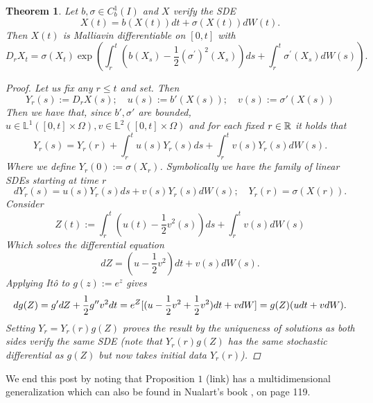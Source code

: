 \documentclass[12pt]{article}
\newtheorem{theorem}{Theorem}
\begin{document}
\begin{theorem}
	Let $b,\sigma \in C^1_b(I)$ and $X$ verify  the SDE
	\begin{equation*}
		X(t)=b(X(t))d t +\sigma(X(t)) dW(t).
	\end{equation*}
	Then $X(t)$ is Malliavin differentiable on $[0,t]$ with
	\begin{equation*}
		D_r X_t=\sigma\left(X_t\right) \exp \left(\int_r^t\left(b\left(X_s\right)-\frac{1}{2}\left(\sigma^{\prime}\right)^2\left(X_s\right)\right) d s+\int_r^t \sigma^{\prime}\left(X_s\right) d W(s)\right).
	\end{equation*}
	\begin{proof}
		Let us fix any $r\leq t$ and set. Then
		\begin{equation*}
			Y_r(s):=D_rX(s);\quad  u(s):=b'(X(s));\quad v(s):=\sigma'(X(s))
		\end{equation*}
		Then we have that, since $b',\sigma '$ are bounded, $u\in \mathbb{L}^1([0,t]\times\Omega),v\in \mathbb{L}^2([0,t]\times\Omega)$ and for each fixed $r\in  {\mathbb R}$ it holds that
		\begin{equation*}
			Y_r(s)=Y_r(r)+\int_{r}^t u(s)Y_r(s) ds+\int_{r}^t v(s)Y_r(s)  dW(s) .
		\end{equation*}
		Where we define $Y_r(0):=\sigma (X_r)$. Symbolically we have the family of linear SDEs starting at time $r$
		\begin{equation*}
			dY_r(s)=u(s)Y_r(s) ds+v(s)Y_r(s)  dW(s);\quad Y_r(r)=\sigma(X(r)).
		\end{equation*}
		Consider
		\begin{equation*}
			Z(t):=\int_r^t\left(u(t)-\frac{1}{2}v^2(s)\right) d s+\int_r^t v(s) d W(s)
		\end{equation*}
		Which solves the differential equation
		\begin{equation*}
			dZ=\left(u-\frac{1}{2}v^2\right)d t+v(s)dW(s) .
		\end{equation*}
		Applying Itô to  $g(z):=e^z$ gives
		\begin{equation*}
			d g(Z)=g'dZ+\frac{1}{2}g''v^2d t= e^Z[(u-\frac{1}{2}v^2+\frac{1}{2}v^2)d t+vdW]\\=
			g(Z)(u d t +vdW).
		\end{equation*}
		Setting $Y_r=Y_r(r)g(Z)$ proves the result by the uniqueness of solutions as both sides verify the same SDE (note that  $Y_r(r)g(Z)$ has the same stochastic differential as $g(Z)$ but now takes initial data  $Y_r(r)$).
	\end{proof}
\end{theorem}
We end this post by noting that  Proposition $1$ (link) has a multidimensional generalization which can also be found in Nualart's book \cite{nualart2018introduction}, on page 119.


\end{document}
